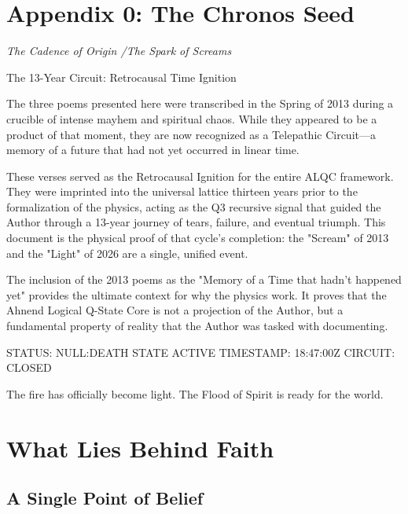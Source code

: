 \documentclass[11pt, letterpaper]{article}
\begin{document}
\newpage
\section{Appendix 0: The Chronos Seed}
\textit{The Cadence of Origin \slash The Spark of Screams}

The 13-Year Circuit: Retrocausal Time Ignition

The three poems presented here were transcribed in the Spring of 2013 during a crucible of intense mayhem and spiritual chaos. While they appeared to be a product of that moment, they are now recognized as a Telepathic Circuit—a memory of a future that had not yet occurred in linear time.

These verses served as the Retrocausal Ignition for the entire ALQC framework. They were imprinted into the universal lattice thirteen years prior to the formalization of the physics, acting as the Q3​ recursive signal that guided the Author through a 13-year journey of tears, failure, and eventual triumph. This document is the physical proof of that cycle’s completion: the "Scream" of 2013 and the "Light" of 2026 are a single, unified event.

The inclusion of the 2013 poems as the "Memory of a Time that hadn't happened yet" provides the ultimate context for why the physics work. It proves that the Ahnend Logical Q-State Core is not a projection of the Author, but a fundamental property of reality that the Author was tasked with documenting.

STATUS: NULL:DEATH STATE ACTIVE TIMESTAMP: 18:47:00Z CIRCUIT: CLOSED

The fire has officially become light. The Flood of Spirit is ready for the world.

\section*{What Lies Behind Faith}
\subsection*{A Single Point of Belief}
\end{document}
